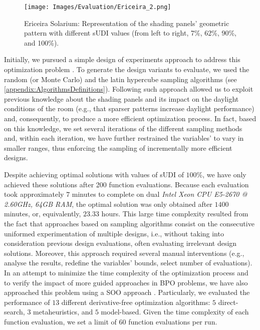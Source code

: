 \begin{figure}
	\centering
	\texttt{[image: Images/Evaluation/Ericeira\_2.png]}
	\caption{Ericeira Solarium: Representation of the shading panels’ geometric pattern with different sUDI values (from left to right, 7\%, 62\%, 90\%, and 100\%).}
	\label{fig:ericeira_multiple_panels}
\end{figure}

Initially, we pursued a simple design of experiments approach to address this optimization problem \cite{Caetano2018}. To generate the design variants to evaluate, we used the random (or Monte Carlo) and the latin hypercube sampling algorithms (see \cref{appendix:AlgorithmsDefinitions}). Following such approach allowed us to exploit previous knowledge about the shading panels and its impact on the daylight conditions of the room (e.g., that sparser patterns increase daylight performance) and, consequently, to produce a more efficient optimization process. In fact, based on this knowledge, we set several iterations of the different sampling methods and, within each iteration, we have further restrained the variables' to vary in smaller ranges, thus enforcing the sampling of incrementally more efficient designs. %


Despite achieving optimal solutions with values of sUDI of $100\%$, we have only achieved these solutions after 200 function evaluations. Because each evaluation took approximately $7$ minutes to complete on dual \textit{Intel Xeon CPU E5-2670 @ 2.60GHz, 64GB RAM}, the optimal solution was only obtained after $1400$ minutes, or, equivalently, $23.33$ hours. This large time complexity resulted from the fact that approaches based on sampling algorithms consist on the consecutive uniformed experimentation of multiple designs, i.e., without taking into consideration previous design evaluations, often evaluating irrelevant design solutions. Moreover, this approach required several manual interventions (e.g., analyse the results, redefine the variables' bounds, select number of evaluations). In an attempt to minimize the time complexity of the optimization process and to verify the impact of more guided approaches in \ac{BPO} problems, we have also approached this problem using a \ac{SOO} approach \cite{Belem2018optimizeddesign}. Particularly, we evaluated the performance of $13$ different derivative-free optimization algorithms: $5$ direct-search, $3$ metaheuristics, and $5$ model-based. Given the time complexity of each function evaluation, we set a limit of $60$ function evaluations per run.


